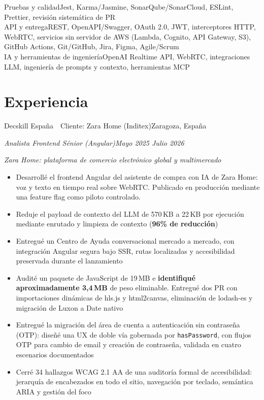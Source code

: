 \documentclass[10pt,a4paper]{article}
\newcommand{\job}[4]{%
  \vspace{5pt}%
  {\latosemibold\color{dark}#1\hfill{\latolight\small\color{light}#2}}\par
  {\itshape\small\color{mid}#3\hfill{\latolight\small\color{light}#4}}\par\vspace{2pt}%
}
\newcommand{\context}[1]{%
  {\latolight\itshape\small\color{mid}\hspace{0.8em}#1}\vspace{2pt}%
}
\newenvironment{items}{%
  \begin{itemize}[leftmargin=1.2em, itemsep=0pt, topsep=2pt, parsep=0pt, label={\color{light}\textbullet}]
    \normalsize\color{dark}
}{%
  \end{itemize}%
}
\newcommand{\skill}[2]{%
  {\normalsize\latosemibold #1\normalfont\enspace\color{mid}#2}\\[3pt]
}
\begin{document}
\skill{Pruebas y calidad}{Jest, Karma/Jasmine, SonarQube/SonarCloud, ESLint, Prettier, revisión sistemática de PR}

\skill{API y entrega}{REST, OpenAPI/Swagger, OAuth 2.0, JWT, interceptores HTTP, WebRTC, servicios sin servidor de AWS (Lambda, Cognito, API Gateway, S3), GitHub Actions, Git/GitHub, Jira, Figma, Agile/Scrum}

\skill{IA y herramientas de ingeniería}{OpenAI Realtime API, WebRTC, integraciones LLM, ingeniería de prompts y contexto, herramientas MCP}

\section{Experiencia}

\job{Decskill España \,\textperiodcentered\, Cliente: Zara Home (Inditex)}{Zaragoza, España}{Analista Frontend Sénior (Angular)}{Mayo 2025 \textendash{} Julio 2026}
\context{Zara Home: plataforma de comercio electrónico global y multimercado}
\begin{items}
  \item Desarrollé el frontend Angular del asistente de compra con IA de Zara Home: voz y texto en tiempo real sobre WebRTC. Publicado en producción mediante una feature flag como piloto controlado.
  \item Reduje el payload de contexto del LLM de 570\,KB a 22\,KB por ejecución mediante enrutado y limpieza de contexto (\textbf{96\% de reducción})
  \item Entregué un Centro de Ayuda conversacional mercado a mercado, con integración Angular segura bajo SSR, rutas localizadas y accesibilidad preservada durante el lanzamiento
  \item Audité un paquete de JavaScript de 19\,MB e \textbf{identifiqué aproximadamente 3,4\,MB} de peso eliminable. Entregué dos PR con importaciones dinámicas de hls.js y html2canvas, eliminación de lodash-es y migración de Luxon a Date nativo
  \item Entregué la migración del área de cuenta a autenticación sin contraseña (OTP): diseñé una UX de doble vía gobernada por \texttt{hasPassword}, con flujos OTP para cambio de email y creación de contraseña, validada en cuatro escenarios documentados
  \item Cerré 34 hallazgos WCAG 2.1 AA de una auditoría formal de accesibilidad: jerarquía de encabezados en todo el sitio, navegación por teclado, semántica ARIA y gestión del foco
\end{items}
\end{document}
